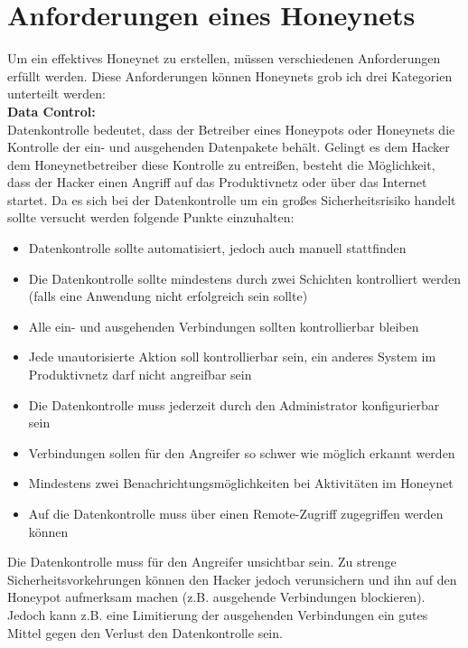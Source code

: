 \section{Anforderungen eines Honeynets}
\noindent Um ein effektives Honeynet zu erstellen, müssen verschiedenen Anforderungen erfüllt werden. Diese Anforderungen können Honeynets grob ich drei Kategorien unterteilt werden\cite{spitzner.2002a}:\\

\noindent\textbf{Data Control: }\\
Datenkontrolle bedeutet, dass der Betreiber eines Honeypots oder Honeynets die Kontrolle der ein- und ausgehenden Datenpakete behält. Gelingt es dem Hacker dem Honeynetbetreiber diese Kontrolle zu entreißen, besteht die Möglichkeit, dass der Hacker einen Angriff auf das Produktivnetz oder über das Internet startet. Da es sich bei der Datenkontrolle um ein großes Sicherheitsrisiko handelt sollte versucht werden folgende Punkte einzuhalten\cite{spitzner.2002a}:
\begin{itemize}
\item Datenkontrolle sollte automatisiert, jedoch auch manuell stattfinden
\item Die Datenkontrolle sollte mindestens durch zwei Schichten kontrolliert werden (falls eine Anwendung nicht erfolgreich sein sollte)
\item Alle ein- und ausgehenden Verbindungen sollten kontrollierbar bleiben
\item Jede unautorisierte Aktion soll kontrollierbar sein, ein anderes System im Produktivnetz darf nicht angreifbar sein
\item Die Datenkontrolle muss jederzeit durch den Administrator konfigurierbar sein
\item Verbindungen sollen für den Angreifer so schwer wie möglich erkannt werden
\item Mindestens zwei Benachrichtungsmöglichkeiten bei Aktivitäten im Honeynet
\item Auf die Datenkontrolle muss über einen Remote-Zugriff zugegriffen werden können
\end{itemize}
\noindent Die Datenkontrolle muss für den Angreifer unsichtbar sein. Zu strenge Sicherheitsvorkehrungen können den Hacker jedoch verunsichern und ihn auf den Honeypot aufmerksam machen (z.B. ausgehende Verbindungen blockieren). Jedoch kann z.B. eine Limitierung der ausgehenden Verbindungen ein gutes Mittel gegen den Verlust den Datenkontrolle sein\cite{WebHnet.2006b}\cite{spitzner.2002a}. \\


